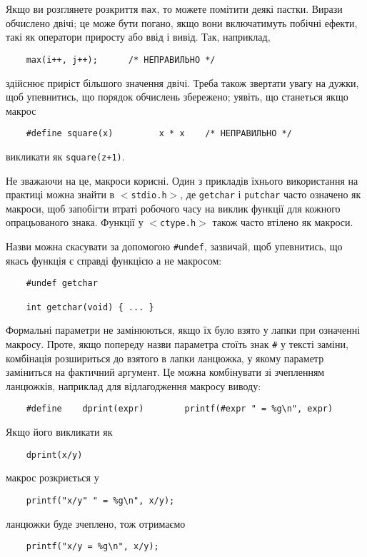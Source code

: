 \documentclass[a4paper,12pt]{book}
\begin{document}
  Якщо ви розглянете розкриття \texttt{max}, то можете помітити деякі пастки. Вирази
  обчислено двічі; це може бути погано, якщо вони включатимуть побічні ефекти, такі як
  оператори приросту або ввід і вивід. Так, наприклад,
  \begin{verbatim}
    max(i++, j++);      /* НЕПРАВИЛЬНО */
  \end{verbatim}
  здійснює приріст більшого значення двічі. Треба також звертати увагу на дужки, щоб
  упевнитись, що порядок обчислень збережено; уявіть, що станеться якщо макрос
  \begin{verbatim}
    #define square(x)         x * x    /* НЕПРАВИЛЬНО */
  \end{verbatim}
  викликати як \texttt{square(z+1)}.

  Не зважаючи на це, макроси корисні. Один з прикладів їхнього використання на практиці
  можна знайти в \texttt{\mbox{$<$}stdio.h\mbox{$>$}}, де \texttt{getchar} і \texttt{putchar} часто
  означено як макроси, щоб запобігти втраті робочого часу на виклик функції для кожного
  опрацьованого знака. Функції у \texttt{\mbox{$<$}ctype.h\mbox{$>$}} також часто втілено як макроси.

  Назви можна скасувати за допомогою \texttt{\#undef}, зазвичай, щоб упевнитись, що якась
  функція є справді функцією а не макросом:
  \begin{verbatim}
    #undef getchar

    int getchar(void) { ... }
  \end{verbatim}

  Формальні параметри не замінюються, якщо їх було взято у лапки при означенні макросу.
  Проте, якщо попереду назви параметра стоїть знак \texttt{\#} у тексті заміни, комбінація
  розшириться до взятого в лапки ланцюжка, у якому параметр заміниться на фактичний
  аргумент. Це можна комбінувати зі зчепленням ланцюжків, наприклад для відлагодження
  макросу виводу:
  \begin{verbatim}
    #define    dprint(expr)        printf(#expr " = %g\n", expr)
  \end{verbatim}

  Якщо його викликати як
  \begin{verbatim}
    dprint(x/y)
  \end{verbatim}
  макрос розкриється у
  \begin{verbatim}
    printf("x/y" " = %g\n", x/y);
  \end{verbatim}
  ланцюжки буде зчеплено, тож отримаємо
  \begin{verbatim}
    printf("x/y = %g\n", x/y);
  \end{verbatim}
\end{document}
